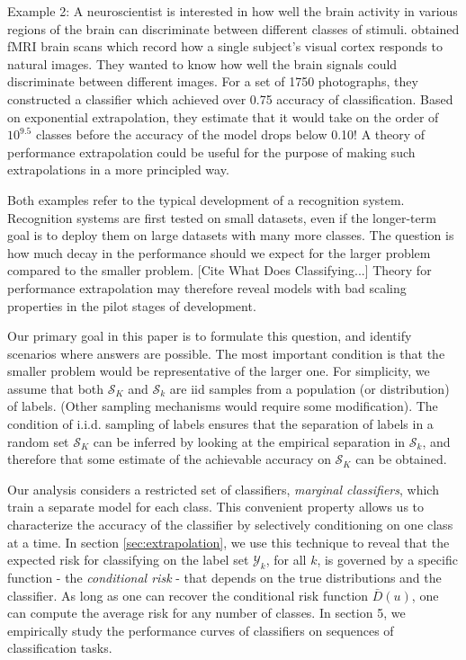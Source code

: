 \documentclass[12pt]{article}
\begin{document}
Example 2: A neuroscientist is interested in how well the brain
  activity in various regions of the brain can discriminate between
  different classes of stimuli.  \cite{Kay2008a} obtained fMRI brain
  scans which record how a single subject's visual cortex responds to
  natural images. They wanted to know how well the brain signals could
  discriminate between different images. For a set of 1750
  photographs, they constructed a classifier which achieved over 0.75
  accuracy of classification. Based on exponential extrapolation, they
  estimate that it would take on the order of $10^{9.5}$ classes
  before the accuracy of the model drops below 0.10!  A theory of
  performance extrapolation could be useful for the purpose of making
  such extrapolations in a more principled way.
  
Both examples refer to the typical development of a recognition system. 
Recognition systems are first tested on small datasets, even 
if the longer-term goal is to deploy them on large datasets with many more classes.
The question is how much decay in the performance should we expect for the larger problem compared to the smaller problem. [Cite What Does Classifying...]
Theory for performance extrapolation may therefore
reveal models with bad scaling properties in the pilot stages of
development.

Our primary goal in this paper is to formulate this question, and
identify scenarios where answers are possible. 
The most important condition is that the smaller problem would be 
representative of the larger one. For simplicity, we
assume that both $\mathcal{S}_K$ and $\mathcal{S}_k$ are iid samples
from a population (or distribution) of labels. (Other sampling 
mechanisms would require some modification). 
The condition of i.i.d. sampling of labels ensures that the
separation of labels in a random set $\mathcal{S}_K$ can be inferred by
looking at the empirical separation in $\mathcal{S}_k$, and
therefore that some estimate of the achievable accuracy on
$\mathcal{S}_K$ can be obtained.

Our analysis considers a restricted set of classifiers,
\emph{marginal classifiers}, which train a separate model for each class. 
This convenient property allows us to
characterize the accuracy of the classifier by selectively
conditioning on one class at a time.  In section \ref{sec:extrapolation}, we use this
technique to reveal that the expected risk for classifying on the
label set $\mathcal{Y}_k$, for all $k$, is governed by a
specific function - the \emph{conditional risk} -  
that depends on the true distributions and the classifier. 
As long as one can recover the conditional risk
function $\bar{D}(u)$, one can compute the average risk for any number
of classes. 
  In section 5, we
empirically study the performance curves of classifiers on sequences
of classification tasks. 
\end{document}
